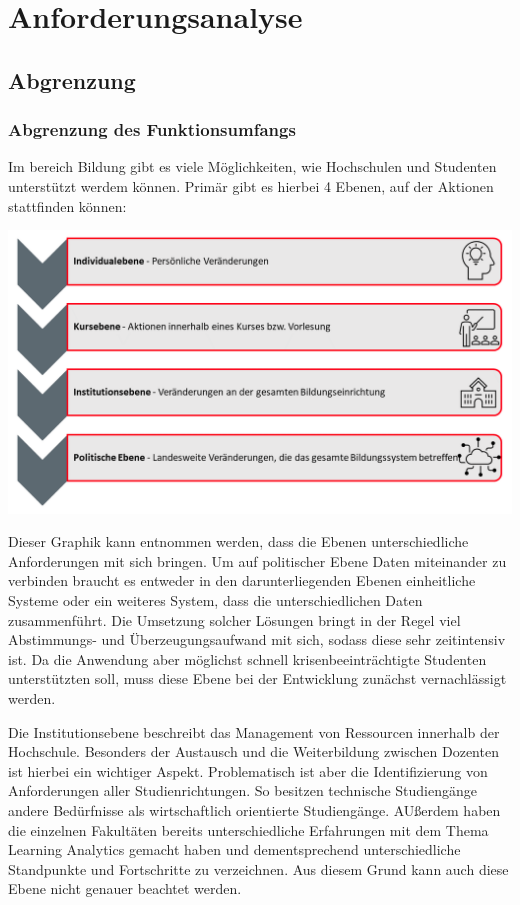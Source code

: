 \chapter{Anforderungsanalyse} %
\section{Abgrenzung}
\subsection{Abgrenzung des Funktionsumfangs}\label{sub:abgrenzung}
Im bereich Bildung gibt es viele Möglichkeiten, wie Hochschulen und Studenten unterstützt werdem können.
Primär gibt es hierbei 4 Ebenen, auf der Aktionen stattfinden können:
\begin{center}
	\includegraphics[width=\linewidth, keepaspectratio]{img/4LA.png}
\end{center}
Dieser Graphik kann entnommen werden, dass die Ebenen unterschiedliche Anforderungen mit sich bringen. Um auf politischer Ebene Daten miteinander zu verbinden braucht es entweder in den darunterliegenden Ebenen einheitliche Systeme oder ein weiteres System, dass die unterschiedlichen Daten zusammenführt. Die Umsetzung solcher Lösungen bringt in der Regel viel Abstimmungs- und Überzeugungsaufwand mit sich, sodass diese sehr zeitintensiv ist. Da die Anwendung aber möglichst schnell krisenbeeinträchtigte Studenten unterstützten soll, muss diese Ebene bei der Entwicklung zunächst vernachlässigt werden.

Die Institutionsebene beschreibt das Management von Ressourcen innerhalb der Hochschule. Besonders der Austausch und die Weiterbildung zwischen Dozenten ist hierbei ein wichtiger Aspekt. Problematisch ist aber die Identifizierung von Anforderungen aller Studienrichtungen. So besitzen technische Studiengänge andere Bedürfnisse als wirtschaftlich orientierte Studiengänge. AUßerdem haben die einzelnen Fakultäten bereits unterschiedliche Erfahrungen mit dem Thema Learning Analytics gemacht haben und dementsprechend unterschiedliche Standpunkte und Fortschritte zu verzeichnen. Aus diesem Grund kann auch diese Ebene nicht genauer beachtet werden.

